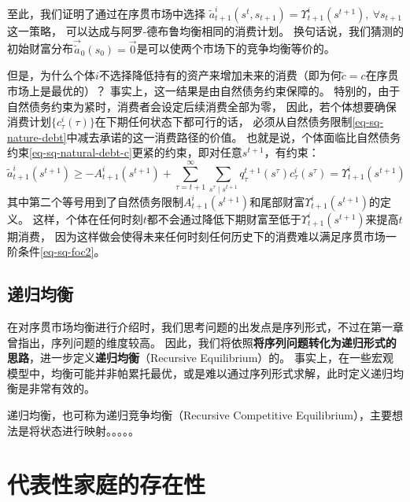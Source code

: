 至此，我们证明了通过在序贯市场中选择
$\tilde{a}_{t+1}^i\left(s^t,s_{t+1}\right)=\Upsilon_{t+1}^i\left(s^{t+1}\right), ~\forall s_{t+1}$这一策略，
可以达成与阿罗-德布鲁均衡相同的消费计划。
换句话说，我们猜测的初始财富分布$\vec{\tilde{a}}_0\left(s_0\right)=\vec{0}$是可以使两个市场下的竞争均衡等价的。

但是，为什么个体$i$不选择降低持有的资产来增加未来的消费（即为何$\tilde{c}=c$在序贯市场上是最优的）？
事实上，这一结果是由自然债务约束保障的。
特别的，由于自然债务约束为紧时，消费者会设定后续消费全部为零，
因此，若个体想要确保消费计划$\{c_{\tau}^i\left(\tau\right)\}$在下期任何状态下都可行的话，
必须从自然债务限制\ref{eq-sq-nature-debt}中减去承诺的这一消费路径的价值。
也就是说，个体面临比自然债务约束\ref{eq-sq-natural-debt-c}更紧的约束，即对任意$s^{t+1}$，有约束：
\begin{equation*}
    \tilde{a}_{t+1}^i\left(s^{t+1}\right) \geq 
        -A_{t+1}^i\left(s^{t+1}\right)
            +\sum_{\tau=t+1}^{\infty} \sum_{s^\tau \mid s^{t+1}} q_\tau^{t+1}\left(s^\tau\right) c_\tau^i\left(s^\tau\right)
                =\Upsilon_{t+1}^i\left(s^{t+1}\right)
\end{equation*}
其中第二个等号用到了自然债务限制$A_{t+1}^i\left(s^{t+1}\right)$和尾部财富$\Upsilon_{t+1}^i\left(s^{t+1}\right)$的定义。
这样，个体在任何时刻$t$都不会通过降低下期财富至低于$\Upsilon_{t+1}^i\left(s^{t+1}\right)$来提高$t$期消费，
因为这样做会使得未来任何时刻任何历史下的消费难以满足序贯市场一阶条件\ref{eq-sq-foc2}。


\subsection{递归均衡}

在对序贯市场均衡进行介绍时，我们思考问题的出发点是序列形式，不过在第一章曾指出，序列问题的维度较高。
因此，我们将依照\textbf{将序列问题转化为递归形式的思路}，进一步定义\textbf{递归均衡}（Recursive Equilibrium）的。
事实上，在一些宏观模型中，均衡可能并非帕累托最优，或是难以通过序列形式求解，此时定义递归均衡是非常有效的。

递归均衡，也可称为递归竞争均衡（Recursive Competitive Equilibrium），主要想法是将状态进行映射。。。。。



\section{代表性家庭的存在性}


